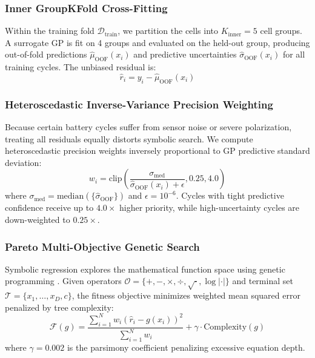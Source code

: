 \documentclass[a4paper,fleqn]{cas-sc}
\begin{document}
\subsubsection{Inner GroupKFold Cross-Fitting}
Within the training fold $\mathcal{D}_{\text{train}}$, we partition the cells into $K_{\text{inner}}=5$ cell groups. A surrogate GP is fit on 4 groups and evaluated on the held-out group, producing out-of-fold predictions $\hat{\mu}_{\text{OOF}}(x_i)$ and predictive uncertainties $\hat{\sigma}_{\text{OOF}}(x_i)$ for all training cycles. The unbiased residual is:
\begin{equation}
    \hat{r}_i = y_i - \hat{\mu}_{\text{OOF}}(x_i)
\end{equation}

\subsubsection{Heteroscedastic Inverse-Variance Precision Weighting}
Because certain battery cycles suffer from sensor noise or severe polarization, treating all residuals equally distorts symbolic search. We compute heteroscedastic precision weights inversely proportional to GP predictive standard deviation:
\begin{equation}
    w_i = \text{clip}\left( \frac{\sigma_{\text{med}}}{\hat{\sigma}_{\text{OOF}}(x_i) + \epsilon}, 0.25, 4.0 \right)
\end{equation}
where $\sigma_{\text{med}} = \text{median}(\{\hat{\sigma}_{\text{OOF}}\})$ and $\epsilon = 10^{-6}$. Cycles with tight predictive confidence receive up to $4.0\times$ higher priority, while high-uncertainty cycles are down-weighted to $0.25\times$.

\subsubsection{Pareto Multi-Objective Genetic Search}
Symbolic regression explores the mathematical function space using genetic programming \cite{cranmer2023pysr}. Given operators $\mathcal{O} = \{+, -, \times, \div, \sqrt{\cdot}, \log|\cdot|\}$ and terminal set $\mathcal{T} = \{x_1, \dots, x_D, c\}$, the fitness objective minimizes weighted mean squared error penalized by tree complexity:
\begin{equation}
    \mathcal{F}(g) = \frac{\sum_{i=1}^N w_i \left( \hat{r}_i - g(x_i) \right)^2}{\sum_{i=1}^N w_i} + \gamma \cdot \text{Complexity}(g)
\end{equation}
where $\gamma = 0.002$ is the parsimony coefficient penalizing excessive equation depth.
\end{document}
